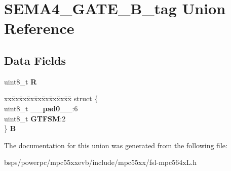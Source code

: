 \hypertarget{unionSEMA4__GATE__8B__tag}{}\section{S\+E\+M\+A4\+\_\+\+G\+A\+T\+E\+\_\+B\+\_\+tag Union Reference}
\label{unionSEMA4__GATE__8B__tag}
\subsection*{Data Fields}
\begin{DoxyCompactItemize}
\item 
\mbox{\label{unionSEMA4__GATE__8B__tag_aec095f634df0b8a68acf70167c9ce7ec}} 
uint8\+\_\+t {\bfseries R}
\item 
\mbox{\label{unionSEMA4__GATE__8B__tag_a42be243027fe8b46ee01ad2a4394000d}} 
\begin{tabbing}
xx\=xx\=xx\=xx\=xx\=xx\=xx\=xx\=xx\=\kill
struct \{\\
\>uint8\_t {\bfseries \_\_pad0\_\_}:6\\
\>uint8\_t {\bfseries GTFSM}:2\\
\} {\bfseries B}\\

\end{tabbing}\end{DoxyCompactItemize}


The documentation for this union was generated from the following file\+:\begin{DoxyCompactItemize}
\item 
bsps/powerpc/mpc55xxevb/include/mpc55xx/fsl-\/mpc564x\+L.\+h\end{DoxyCompactItemize}
